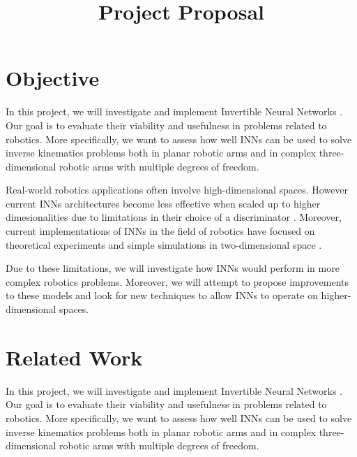 \documentclass[conference]{IEEEtran}
\begin{document}
\nocite{*}

\title{Project Proposal}

\author{
\and
{}
}

\maketitle

\section*{Objective}

In this project, we will investigate and implement Invertible Neural Networks \cite{Ardizzone2018}.
Our goal is to evaluate their viability and usefulness in problems related to robotics.
More specifically, we want to assess how well INNs can be used to solve inverse kinematics problems
both in planar robotic arms and in complex three-dimensional robotic arms with multiple degrees of freedom.

Real-world robotics applications often involve high-dimensional spaces.
However current INNs architectures become less effective when scaled up to higher dimesionalities
due to limitations in their choice of a discriminator \cite{Ardizzone2018}.
Moreover, current implementations of INNs in the field of robotics have focused on theoretical experiments
and simple simulations in two-dimensional space \cite{Ardizzone2018}.

Due to these limitations, we will investigate how INNs would perform in more complex robotics problems.
Moreover, we will attempt to propose improvements to these models and look for new techniques to allow
INNs to operate on higher-dimensional spaces.

\section*{Related Work}

In this project, we will investigate and implement Invertible Neural Networks \cite{Ardizzone2018}.
Our goal is to evaluate their viability and usefulness in problems related to robotics.
More specifically, we want to assess how well INNs can be used to solve inverse kinematics problems
both in planar robotic arms and in complex three-dimensional robotic arms with multiple degrees of freedom.
\end{document}
